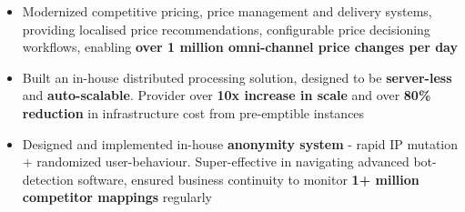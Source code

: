 \documentclass[10pt,a4paper,ragged2e,withhyper]{altacv}
\begin{document}
\begin{paracol}{2}
\begin{itemize}
\item Modernized competitive pricing, price management and delivery systems, providing localised price recommendations, configurable price decisioning workflows, enabling \textbf{over 1 million omni-channel price changes per day}
\item Built an in-house distributed processing solution, designed to be \textbf{server-less} and \textbf{auto-scalable}. Provider over \textbf{10x increase in scale} and over \textbf{80\% reduction} in infrastructure cost from pre-emptible instances
\item Designed and implemented in-house \textbf{anonymity system} - rapid IP mutation + randomized user-behaviour. Super-effective in navigating advanced bot-detection software, ensured business continuity to monitor \textbf{1+ million competitor mappings} regularly
\end{itemize}













\end{paracol}
\end{document}
